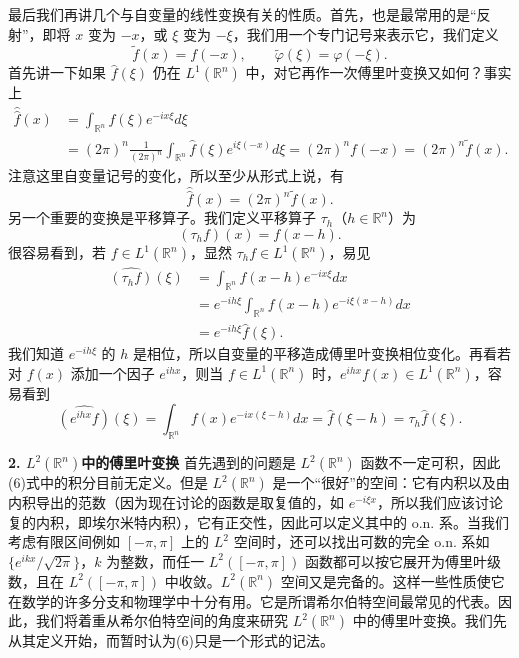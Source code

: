 最后我们再讲几个与自变量的线性变换有关的性质。首先，也是最常用的是“反射”，即将 $x$ 变为 $-x$，或 $\xi$ 变为 $-\xi$，我们用一个专门记号来表示它，我们定义
\[
 \widetilde f(x)=f(-x),\qquad \widetilde\varphi(\xi)=\varphi(-\xi).
\]
首先讲一下如果 $\widehat f(\xi)$ 仍在 $L^1(\mathbb R^n)$ 中，对它再作一次傅里叶变换又如何？事实上
\[
 \begin{aligned}
 \widehat{\widehat f}(x)
 &=\int_{\mathbb R^n}\widehat f(\xi)e^{-ix\xi}d\xi\\
 &=(2\pi)^n\frac1{(2\pi)^n}\int_{\mathbb R^n}\widehat f(\xi)e^{i\xi(-x)}d\xi
 =(2\pi)^nf(-x)=(2\pi)^n\widetilde f(x).
 \end{aligned}
\]
注意这里自变量记号的变化，所以至少从形式上说，有
\begin{equation}
 \widehat{\widehat f}(x)=(2\pi)^n\widetilde f(x).
 \tag{24}
\end{equation}
另一个重要的变换是平移算子。我们定义平移算子 $\tau_h$（$h\in\mathbb R^n$）为
\[
 (\tau_hf)(x)=f(x-h).
\]
很容易看到，若 $f\in L^1(\mathbb R^n)$，显然 $\tau_hf\in L^1(\mathbb R^n)$，易见
\[
 \begin{aligned}
 \widehat{(\tau_hf)}(\xi)
 &=\int_{\mathbb R^n}f(x-h)e^{-ix\xi}dx\\
 &=e^{-ih\xi}\int_{\mathbb R^n}f(x-h)e^{-i\xi(x-h)}dx\\
 &=e^{-ih\xi}\widehat f(\xi).
 \end{aligned}
 \tag{25}
\]
我们知道 $e^{-ih\xi}$ 的 $h$ 是相位，所以自变量的平移造成傅里叶变换相位变化。再看若对 $f(x)$ 添加一个因子 $e^{ihx}$，则当 $f\in L^1(\mathbb R^n)$ 时，$e^{ihx}f(x)\in L^1(\mathbb R^n)$，容易看到
\begin{equation}
 \widehat{(e^{ihx}f)}(\xi)=\int_{\mathbb R^n}f(x)e^{-ix(\xi-h)}dx
 =\widehat f(\xi-h)=\tau_h\widehat f(\xi).
 \tag{26}
\end{equation}

\noindent\textbf{2. $L^2(\mathbb R^n)$中的傅里叶变换}\quad
首先遇到的问题是 $L^2(\mathbb R^n)$ 函数不一定可积，因此(6)式中的积分目前无定义。但是 $L^2(\mathbb R^n)$ 是一个“很好”的空间：它有内积以及由内积导出的范数（因为现在讨论的函数是取复值的，如 $e^{-i\xi x}$，所以我们应该讨论复的内积，即埃尔米特内积），它有正交性，因此可以定义其中的 o.n. 系。当我们考虑有限区间例如 $[-\pi,\pi]$ 上的 $L^2$ 空间时，还可以找出可数的完全 o.n. 系如 $\{e^{ikx}/\sqrt{2\pi}\}$，$k$ 为整数，而任一 $L^2([ -\pi,\pi])$ 函数都可以按它展开为傅里叶级数，且在 $L^2([ -\pi,\pi])$ 中收敛。$L^2(\mathbb R^n)$ 空间又是完备的。这样一些性质使它在数学的许多分支和物理学中十分有用。它是所谓希尔伯特空间最常见的代表。因此，我们将着重从希尔伯特空间的角度来研究 $L^2(\mathbb R^n)$ 中的傅里叶变换。我们先从其定义开始，而暂时认为(6)只是一个形式的记法。

